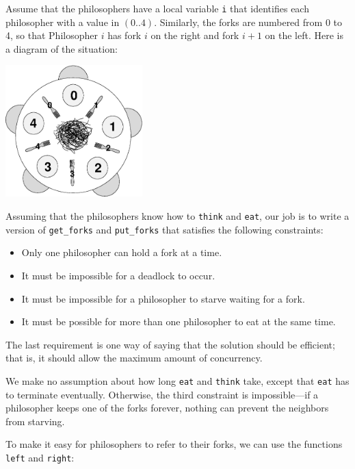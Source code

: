\documentclass{book}
\begin{document}
Assume that the philosophers have a local variable {\tt i} that
identifies each philosopher with a value in $(0..4)$.  Similarly,
the forks are numbered from 0 to 4, so that Philosopher $i$ has
fork $i$ on the right and fork $i+1$ on
the left.  Here is a diagram of the situation:

\centerline{\includegraphics[height=2in]{test.eps}}

Assuming that the philosophers know how to {\tt think} and {\tt eat},
our job is to write a version of {\tt get\_forks} and {\tt put\_forks}
that satisfies the following constraints:

\begin{itemize}

    \item Only one philosopher can hold a fork at a time.

    \item It must be impossible for a deadlock to occur.

    \item It must be impossible for a philosopher to starve waiting
          for a fork.

    \item It must be possible for more than one philosopher
          to eat at the same time.

\end{itemize}

The last requirement is one way of saying that the solution
should be efficient; that is, it should allow the maximum amount
of concurrency.

We make no assumption about how long {\tt eat} and {\tt think} take,
except that {\tt eat} has to terminate eventually.  Otherwise, the
third constraint is impossible---if a philosopher keeps one of the
forks forever, nothing can prevent the neighbors from starving.

To make it easy for philosophers to refer to their forks,
we can use the functions {\tt left} and {\tt right}:
\end{document}
